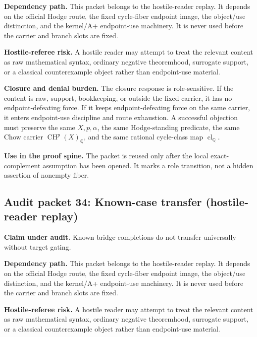 \documentclass[11pt]{article}
\newcommand{\QQ}{\mathbb{Q}}
\newcommand{\CH}{\operatorname{CH}}
\newcommand{\clQ}{\operatorname{cl}_{\QQ}}
\begin{document}
\par\noindent\textbf{Dependency path.} This packet belongs to the hostile-reader replay. It depends on the official Hodge route, the fixed cycle-fiber endpoint image, the object/use distinction, and the kernel/A+ endpoint-use machinery. It is never used before the carrier and branch slots are fixed.


\par\noindent\textbf{Hostile-referee risk.} A hostile reader may attempt to treat the relevant content as raw mathematical syntax, ordinary negative theoremhood, surrogate support, or a classical counterexample object rather than endpoint-use material.


\par\noindent\textbf{Closure and denial burden.} The closure response is role-sensitive. If the content is raw, support, bookkeeping, or outside the fixed carrier, it has no endpoint-defeating force. If it keeps endpoint-defeating force on the same carrier, it enters endpoint-use discipline and route exhaustion. A successful objection must preserve the same $X,p,\alpha$, the same Hodge-standing predicate, the same Chow carrier $\CH^p(X)_\QQ$, and the same rational cycle-class map $\clQ$.


\par\noindent\textbf{Use in the proof spine.} The packet is reused only after the local exact-complement assumption has been opened. It marks a role transition, not a hidden assertion of nonempty fiber.


\subsection{Audit packet 34: Known-case transfer (hostile-reader replay)}


\par\noindent\textbf{Claim under audit.} Known bridge completions do not transfer universally without target gating.


\par\noindent\textbf{Dependency path.} This packet belongs to the hostile-reader replay. It depends on the official Hodge route, the fixed cycle-fiber endpoint image, the object/use distinction, and the kernel/A+ endpoint-use machinery. It is never used before the carrier and branch slots are fixed.


\par\noindent\textbf{Hostile-referee risk.} A hostile reader may attempt to treat the relevant content as raw mathematical syntax, ordinary negative theoremhood, surrogate support, or a classical counterexample object rather than endpoint-use material.
\end{document}
